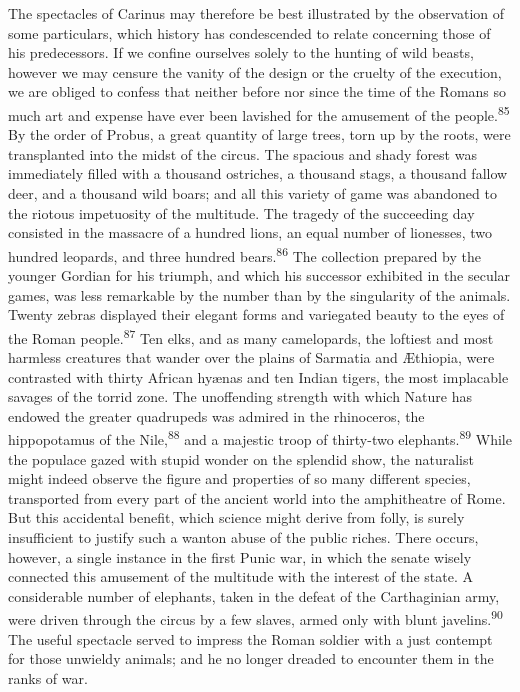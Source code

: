 
The spectacles of Carinus may therefore be best illustrated by
the observation of some particulars, which history has
condescended to relate concerning those of his predecessors. If
we confine ourselves solely to the hunting of wild beasts,
however we may censure the vanity of the design or the cruelty of
the execution, we are obliged to confess that neither before nor
since the time of the Romans so much art and expense have ever
been lavished for the amusement of the people.\textsuperscript{85} By the order of
Probus, a great quantity of large trees, torn up by the roots,
were transplanted into the midst of the circus. The spacious and
shady forest was immediately filled with a thousand ostriches, a
thousand stags, a thousand fallow deer, and a thousand wild
boars; and all this variety of game was abandoned to the riotous
impetuosity of the multitude. The tragedy of the succeeding day
consisted in the massacre of a hundred lions, an equal number of
lionesses, two hundred leopards, and three hundred bears.\textsuperscript{86} The
collection prepared by the younger Gordian for his triumph, and
which his successor exhibited in the secular games, was less
remarkable by the number than by the singularity of the animals.
Twenty zebras displayed their elegant forms and variegated beauty
to the eyes of the Roman people.\textsuperscript{87} Ten elks, and as many
camelopards, the loftiest and most harmless creatures that wander
over the plains of Sarmatia and Æthiopia, were contrasted with
thirty African hyænas and ten Indian tigers, the most implacable
savages of the torrid zone. The unoffending strength with which
Nature has endowed the greater quadrupeds was admired in the
rhinoceros, the hippopotamus of the Nile,\textsuperscript{88} and a majestic troop
of thirty-two elephants.\textsuperscript{89} While the populace gazed with stupid
wonder on the splendid show, the naturalist might indeed observe
the figure and properties of so many different species,
transported from every part of the ancient world into the
amphitheatre of Rome. But this accidental benefit, which science
might derive from folly, is surely insufficient to justify such a
wanton abuse of the public riches. There occurs, however, a
single instance in the first Punic war, in which the senate
wisely connected this amusement of the multitude with the
interest of the state. A considerable number of elephants, taken
in the defeat of the Carthaginian army, were driven through the
circus by a few slaves, armed only with blunt javelins.\textsuperscript{90} The
useful spectacle served to impress the Roman soldier with a just
contempt for those unwieldy animals; and he no longer dreaded to
encounter them in the ranks of war.

